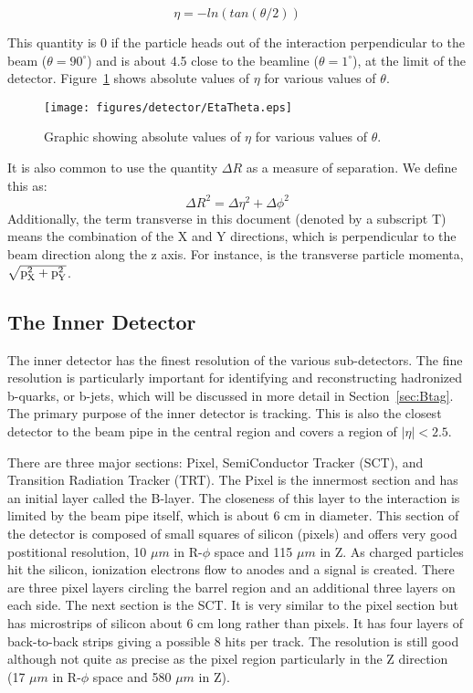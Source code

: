 \begin{equation} \eta = -ln(tan(\theta/2)) \end{equation}

This quantity is 0 if the particle heads out of the interaction perpendicular to the beam ($\theta = 90^{\circ}$) and is about 4.5 close to the beamline ($\theta= 1^{\circ}$), at the limit of the detector.  Figure~\ref{fig:EtaTheta} shows absolute values of $\eta$ for various values of $\theta$.

\begin{figure}[!htpb]
  \centering
    \texttt{[image: figures/detector/EtaTheta.eps]}%
    \label{fig:EtaTheta} 
\caption{Graphic showing absolute values of $\eta$ for various values of $\theta$.}
\end{figure}

It is also common to use the quantity $\Delta R$ as a measure of separation.  We define this as:
\begin{equation} \Delta R^2 = \Delta \eta^2 + \Delta \phi^2 \end{equation}
Additionally, the term transverse in this document (denoted by a subscript T) means the combination of the X and Y directions, which is perpendicular to the beam direction along the z axis.  For instance, \pt is the transverse particle momenta, $\rm \sqrt{p_{X}^2 + p_{Y}^2}$.


\subsection{The Inner Detector}
The inner detector has the finest resolution of the various sub-detectors.  The fine resolution is particularly important for identifying and reconstructing hadronized b-quarks, or b-jets, which will be discussed in more detail in Section~\ref{sec:Btag}.  The primary purpose of the inner detector is tracking.  This is also the closest detector to the beam pipe in the central region and covers a region of $|\eta| < 2.5$.

There are three major sections: Pixel, SemiConductor Tracker (SCT), and Transition Radiation Tracker (TRT).  The Pixel is the innermost section and has an initial layer called the B-layer.  The closeness of this layer to the interaction is limited by the beam pipe itself, which is about 6 cm in diameter.  This section of the detector is composed of small squares of silicon (pixels) and offers very good postitional resolution, 10 $\mu m$ in R-$\phi$ space and 115 $\mu m$ in Z.  As charged particles hit the silicon, ionization electrons flow to anodes and a signal is created.  There are three pixel layers circling the barrel region and an additional three layers on each side.  The next section is the SCT.  It is very similar to the pixel section but has microstrips of silicon about 6 cm long rather than pixels.  It has four layers of back-to-back strips giving a possible 8 hits per track.  The resolution is still good although not quite as precise as the pixel region particularly in the Z direction (17 $\mu m$ in R-$\phi$ space and 580 $\mu m$ in Z).

